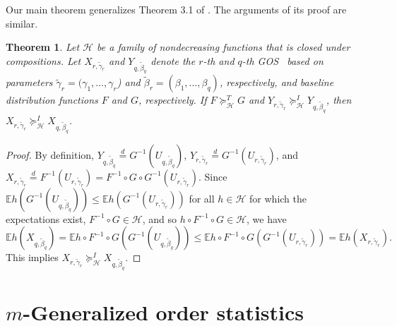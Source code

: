 \documentclass [11pt]{article}
\newtheorem{theorem}{Theorem}
\newcommand{\gos}{GOS}
\begin{document}
Our main theorem generalizes Theorem 3.1 of \cite{ALO-JAP}. The arguments of its proof are similar.
\begin{theorem}\label{t0}
Let $\mathcal{H}$ be a family of nondecreasing functions that is closed under compositions. Let $X_{r,\tilde{\gamma}_r}$ and
$Y_{q,\tilde{\beta}_q}$ denote the $r$-th and $q$-th \gos\
based on parameters $\tilde{\gamma}_r=(\gamma_1,\ldots,\gamma_r$) and $\tilde{\beta}_r=(\beta_1,\ldots,\beta_q)$, respectively, and baseline distribution functions $F$ and $G$, respectively. If $F \succeq_{\mathcal{H}}^T G$ and $Y_{r,\tilde{\gamma}_r}\succeq_{\mathcal{H}}^I Y_{q,\tilde{\beta}_q}$, then $X_{r,\tilde{\gamma}_r}\succeq_{\mathcal{H}}^I X_{q,\tilde{\beta}_q}$.
\end{theorem}
\begin{proof}
By definition, $Y_{q,\tilde{\beta}_q} \stackrel{d}{=} G^{-1}(
U_{q,\tilde{\beta}_q})$,
$Y_{r,\tilde{\gamma}_r} \stackrel{d}{=} G^{-1}(
U_{r,\tilde{\gamma}_r})$, and $X_{r,\tilde{\gamma}_r} \stackrel{d}{=}
F^{-1}(U_{r,\tilde{\gamma}_r})= F^{-1}\circ G \circ G^{-1}(
U_{r,\tilde{\gamma}_r})$.
Since $\mathbb{E}h(G^{-1}(U_{q,\tilde{\beta}_q})) \leq
\mathbb{E}h(G^{-1}(U_{r,\tilde{\gamma}_r}))$
for all $h \in \mathcal{H}$
for which the expectations exist, $F^{-1}\circ G \in \mathcal{H}$,
and so $h \circ F^{-1}\circ G \in \mathcal{H}$, we have
\begin{equation}
\label{3}
\mathbb{E}h(X_{q,\tilde{\beta}_q}) =
\mathbb{E}h\circ F^{-1}\circ G( G^{-1}(U_{q,\tilde{\beta}_q}))
\leq \mathbb{E}h\circ F^{-1}\circ G( G^{-1}(U_{r,\tilde{\gamma}_r}))
=\mathbb{E}h(X_{r,\tilde{\gamma}_r}).
\end{equation}
This implies $X_{r,\tilde{\gamma}_r}
\succeq_{\mathcal{H}}^I X_{q,\tilde{\beta}_q}$.
\end{proof}


\section{$m$-Generalized order statistics}
\label{sec:m-gos}
\end{document}
